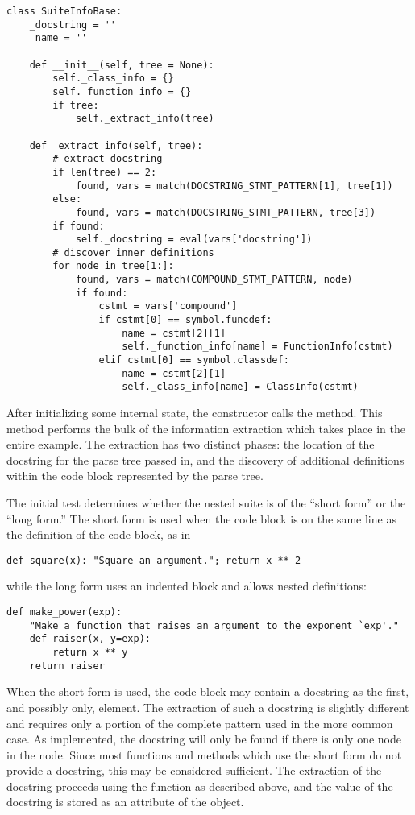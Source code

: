 \bcode\begin{verbatim}
class SuiteInfoBase:
    _docstring = ''
    _name = ''

    def __init__(self, tree = None):
        self._class_info = {}
        self._function_info = {}
        if tree:
            self._extract_info(tree)

    def _extract_info(self, tree):
        # extract docstring
        if len(tree) == 2:
            found, vars = match(DOCSTRING_STMT_PATTERN[1], tree[1])
        else:
            found, vars = match(DOCSTRING_STMT_PATTERN, tree[3])
        if found:
            self._docstring = eval(vars['docstring'])
        # discover inner definitions
        for node in tree[1:]:
            found, vars = match(COMPOUND_STMT_PATTERN, node)
            if found:
                cstmt = vars['compound']
                if cstmt[0] == symbol.funcdef:
                    name = cstmt[2][1]
                    self._function_info[name] = FunctionInfo(cstmt)
                elif cstmt[0] == symbol.classdef:
                    name = cstmt[2][1]
                    self._class_info[name] = ClassInfo(cstmt)
\end{verbatim}\ecode
%
After initializing some internal state, the constructor calls the
 method.  This method performs the bulk of the
information extraction which takes place in the entire example.  The
extraction has two distinct phases: the location of the docstring for
the parse tree passed in, and the discovery of additional definitions
within the code block represented by the parse tree.

The initial  test determines whether the nested suite is of
the ``short form'' or the ``long form.''  The short form is used when
the code block is on the same line as the definition of the code
block, as in

\begin{verbatim}
def square(x): "Square an argument."; return x ** 2
\end{verbatim}
%
while the long form uses an indented block and allows nested
definitions:

\bcode\begin{verbatim}
def make_power(exp):
    "Make a function that raises an argument to the exponent `exp'."
    def raiser(x, y=exp):
        return x ** y
    return raiser
\end{verbatim}\ecode
%
When the short form is used, the code block may contain a docstring as
the first, and possibly only,  element.  The
extraction of such a docstring is slightly different and requires only
a portion of the complete pattern used in the more common case.  As
implemented, the docstring will only be found if there is only
one  node in the  node.  Since most
functions and methods which use the short form do not provide a
docstring, this may be considered sufficient.  The extraction of the
docstring proceeds using the  function as described
above, and the value of the docstring is stored as an attribute of the
 object.

